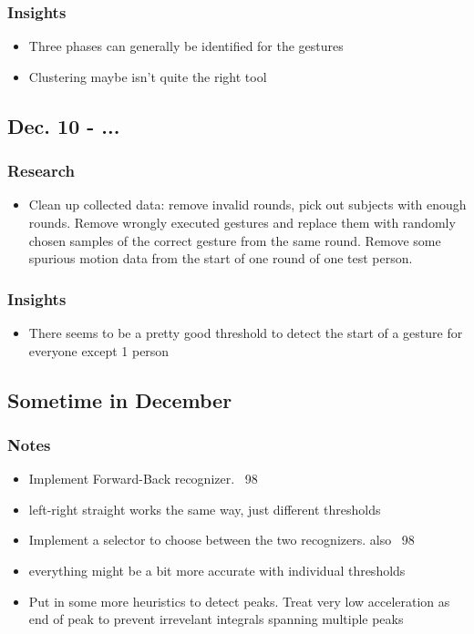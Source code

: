 \documentclass{article}
\begin{document}
\subsubsection{Insights}
\begin{itemize}
\item Three phases can generally be identified for the gestures
\item Clustering maybe isn't quite the right tool
\end{itemize}
\subsection{Dec. 10 - ...}
\subsubsection{Research}
\begin{itemize}
    \item Clean up collected data: remove invalid rounds, pick out subjects with enough rounds. Remove wrongly executed gestures and replace them with randomly chosen samples of the correct gesture from the same round. Remove some spurious motion data from the start of one round of one test person.
\end{itemize}
\subsubsection{Insights}
\begin{itemize}
    \item There seems to be a pretty good threshold to detect the start of a gesture for everyone except 1 person
\end{itemize}
\subsection{Sometime in December}
\subsubsection{Notes}
\begin{itemize}
    \item Implement Forward-Back recognizer. ~98%
    \item left-right straight works the same way, just different thresholds
    \item Implement a selector to choose between the two recognizers. also ~98%
    \item everything might be a bit more accurate with individual thresholds
    \item Put in some more heuristics to detect peaks. Treat very low acceleration as end of peak to prevent irrevelant integrals spanning multiple peaks
    \end{itemize}
\end{document}
